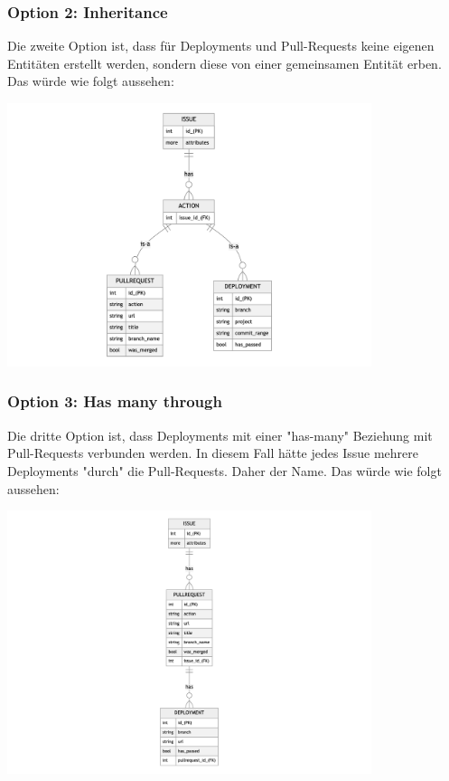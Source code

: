\begin{minipage}{\textwidth}
  \subsubsection{Option 2: Inheritance}
  Die zweite Option ist, dass für Deployments und Pull-Requests keine eigenen Entitäten erstellt werden, sondern diese von
  einer gemeinsamen Entität erben. Das würde wie folgt aussehen:
  \begin{center}
    \includegraphics[width=0.8\textwidth]{images/erd/inheritance.png}
    \label{fig:erd_inheritance}
  \end{center}
\end{minipage}

\begin{minipage}{\textwidth}
  \subsubsection{Option 3: Has many through}
  Die dritte Option ist, dass Deployments mit einer "has-many" Beziehung mit Pull-Requests verbunden werden. In diesem Fall hätte jedes
  Issue mehrere Deployments "durch" die Pull-Requests. Daher der Name. Das würde wie folgt aussehen:
  \begin{center}
    \includegraphics[width=0.8\textwidth]{images/erd/has_many_through.png}
    \label{fig:erd_has_many_through}
  \end{center}
\end{minipage}

